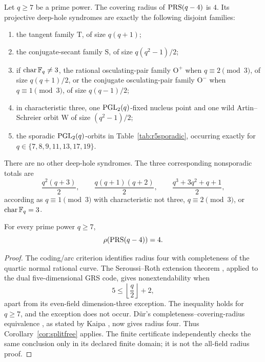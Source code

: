 \begin{theorem}\label{thm:r5}%
%
%
%
%
Let $q\geq7$ be a prime power.  The covering radius of $\operatorname{PRS}(q-4)$ is
$4$.  Its projective deep-hole syndromes are exactly the following
disjoint families:
\begin{enumerate}[label=\textup{(\roman*)}]
\item the tangent family $\mathrm T$, of size $q(q+1)$;
\item the conjugate-secant family $\mathrm S$, of size
      $q(q^2-1)/2$;
\item if $\operatorname{char}\mathbb F_q\ne3$, the rational osculating-pair
      family $\mathrm O^+$ when $q\equiv2\pmod3$, of size $q(q+1)/2$,
      or the conjugate osculating-pair family $\mathrm O^-$ when
      $q\equiv1\pmod3$, of size $q(q-1)/2$;
\item in characteristic three, one $\operatorname{PGL}_2(q)$-fixed nucleus point and
      one wild Artin--Schreier orbit $\mathrm W$ of size $(q^2-1)/2$;
\item the sporadic $\operatorname{PGL}_2(q)$-orbits in Table~\ref{tab:r5sporadic},
      occurring exactly for
      $q\in\{7,8,9,11,13,17,19\}$.
\end{enumerate}
There are no other deep-hole syndromes.  The three corresponding
nonsporadic totals are
\[
\frac{q^2(q+3)}2,\qquad
\frac{q(q+1)(q+2)}2,\qquad
\frac{q^3+3q^2+q+1}{2},
\]
according as $q\equiv1\pmod3$ with characteristic not three,
$q\equiv2\pmod3$, or $\operatorname{char}\mathbb F_q=3$.
\end{theorem}

\begin{proposition}\label{prop:r5-radius}%
%
%
%
For every prime power $q\geq7$,
\[
       \rho(\operatorname{PRS}(q-4))=4.
\]
\end{proposition}

\begin{proof}
The coding/arc criterion identifies radius four with completeness of
the quartic normal rational curve. The Seroussi--Roth extension theorem
\cite[Thm.~1]{SeroussiRoth1986}, applied to the dual five-dimensional
GRS code, gives nonextendability when
\[
       5\leq\left\lfloor\frac q2\right\rfloor+2,
\]
apart from its even-field dimension-three exception. The inequality
holds for \(q\geq7\), and the exception does not occur. Dür's
completeness--covering-radius equivalence \cite{Dur1994}, as stated by
Kaipa \cite[Sec.~IV and Prop.~4(1)]{Kaipa2017}, now gives radius four. Thus
Corollary~\ref{cor:splitfree} applies.  The finite certificate
independently checks the same conclusion only in its declared finite
domain; it is not the all-field radius proof.
\end{proof}

